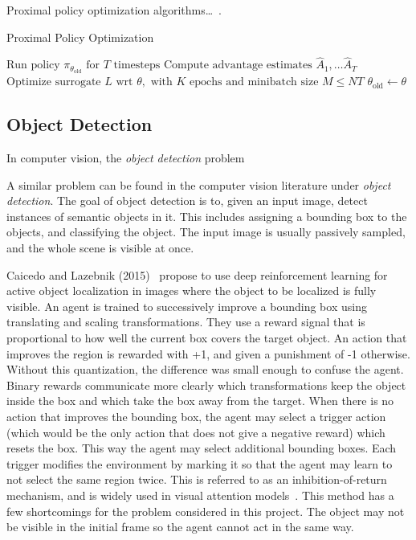Proximal policy optimization algorithms\dots~\cite{schulman_ppo_2017}.

\begin{algorithm}
    \caption{Proximal Policy Optimization}
    \begin{algorithmic}
                \State \(\text{Run policy } \pi_{\theta_\text{old}} \text{ for } T \text{ timesteps}\)
                \State \(\text{Compute advantage estimates } \hat{A}_1, \dots \hat{A}_T\)
            \EndFor
            \State \(\text{Optimize surrogate } L \text{ wrt } \theta, \text{ with } K \text{ epochs and minibatch size } M \leq NT\)
            \State \(\theta_{\text{old}} \leftarrow \theta\)
        \EndFor
    \end{algorithmic}
\end{algorithm}

\subsection{Object Detection}


In computer vision, the \textit{object detection} problem  

A similar problem can be found in the computer vision literature under \textit{object detection}.
The goal of object detection is to, given an input image, detect instances of semantic objects in it.
This includes assigning a bounding box to the objects, and classifying the object.
The input image is usually passively sampled, and the whole scene is visible at once.

Caicedo and Lazebnik (2015)~\cite{caicedo_active_2015} propose to use deep reinforcement learning for active object localization in images where the object to be localized is fully visible.
An agent is trained to successively improve a bounding box using translating and scaling transformations.
They use a reward signal that is proportional to how well the current box covers the target object.
An action that improves the region is rewarded with +1, and given a punishment of -1 otherwise.
Without this quantization, the difference was small enough to confuse the agent.
Binary rewards communicate more clearly which transformations keep the object inside the box and which take the box away from the target.
When there is no action that improves the bounding box, the agent may select a trigger action (which would be the only action that does not give a negative reward) which resets the box.
This way the agent may select additional bounding boxes.
Each trigger modifies the environment by marking it so that the agent may learn to not select the same region twice.
This is referred to as an inhibition-of-return mechanism, and is widely used in visual attention models~\cite{[16] in caicedo_active_2015}.
This method has a few shortcomings for the problem considered in this project.
The object may not be visible in the initial frame so the agent cannot act in the same way. 

